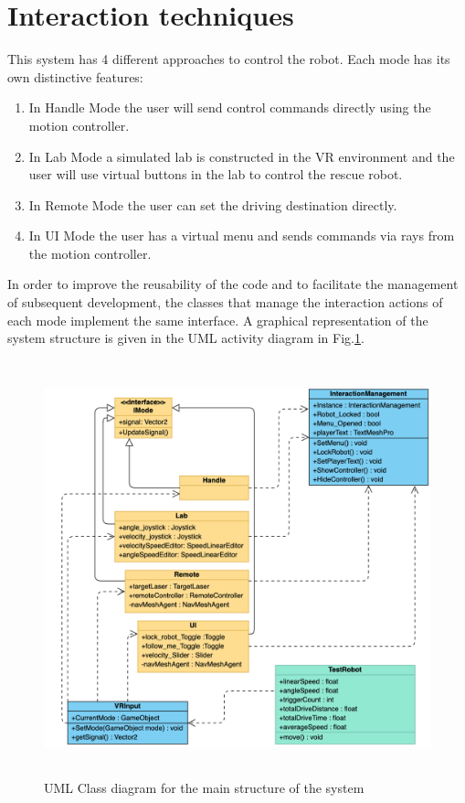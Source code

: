 \section{Interaction techniques}
This system has 4 different approaches to control the robot. Each mode has its own distinctive features: 

\begin{enumerate}
\item In Handle Mode the user will send control commands directly using the motion controller. 
\item In Lab Mode a simulated lab is constructed in the VR environment and the user will use virtual buttons in the lab to control the rescue robot. 
\item In Remote Mode the user can set the driving destination directly. 
\item In UI Mode the user has a virtual menu and sends commands via rays from the motion controller.
\end{enumerate}

In order to improve the reusability of the code and to facilitate the management of subsequent development, the classes that manage the interaction actions of each mode implement the same interface. A graphical representation of the system structure is given in the UML activity diagram in Fig.\ref{fig:uml}.

\begin{figure}[h]
    \centering
    \includegraphics[height=12cm]{graphics/uml.png}
    \caption{UML Class diagram for the main structure of the system}
    \label{fig:uml}
\end{figure}

